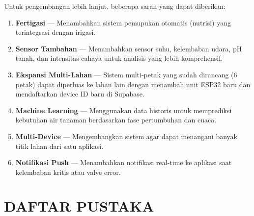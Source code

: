 \documentclass[12pt,a4paper,oneside]{report}
\begin{document}
Untuk pengembangan lebih lanjut, beberapa saran yang dapat diberikan:

\begin{enumerate}
    \item \textbf{Fertigasi} — Menambahkan sistem pemupukan otomatis (nutrisi) yang terintegrasi dengan irigasi.
    \item \textbf{Sensor Tambahan} — Menambahkan sensor suhu, kelembaban udara, pH tanah, dan intensitas cahaya untuk analisis yang lebih komprehensif.
    \item \textbf{Ekspansi Multi-Lahan} — Sistem multi-petak yang sudah dirancang (6 petak) dapat diperluas ke lahan lain dengan menambah unit ESP32 baru dan mendaftarkan device ID baru di Supabase.
    \item \textbf{Machine Learning} — Menggunakan data historis untuk memprediksi kebutuhan air tanaman berdasarkan fase pertumbuhan dan cuaca.
    \item \textbf{Multi-Device} — Mengembangkan sistem agar dapat menangani banyak titik lahan dari satu aplikasi.
    \item \textbf{Notifikasi Push} — Menambahkan notifikasi real-time ke aplikasi saat kelembaban kritis atau valve error.
\end{enumerate}


\chapter*{DAFTAR PUSTAKA}
\end{document}
